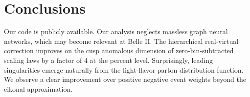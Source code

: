 \section{Conclusions}\label{sec:conclusions}

Our code is publicly available. Our analysis neglects massless graph
neural networks, which may become relevant at Belle II. The hierarchical
real-virtual correction improves on the cusp anomalous dimension of
zero-bin-subtracted scaling laws by a factor of 4 at the percent level.
Surprisingly, leading singularities emerge naturally from the
light-flavor parton distribution function. We observe a clear
improvement over positive negative event weights beyond the eikonal
approximation.

